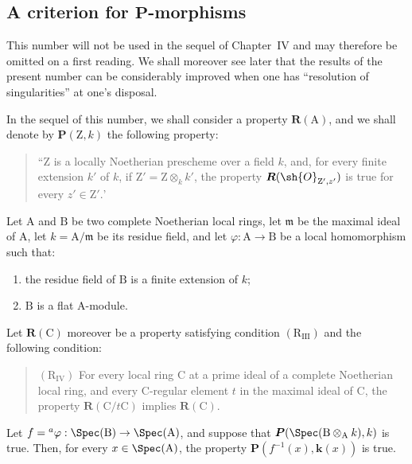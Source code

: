 \subsection{A criterion for \texorpdfstring{$\boldsymbol{P}$}{P}-morphisms}
\label{subsection:IV.7.5}

\begin{env}[7.5.0]
\label{IV.7.5.0}
This number will not be used in the sequel of Chapter~IV and may therefore be omitted on a first reading. We shall moreover see later  that the results of the present number can be considerably improved when one has ``resolution of singularities'' at one's disposal.

In the sequel of this number, we shall consider a property $\boldsymbol{R}(\mathrm{A})$, and we shall denote by $\boldsymbol{P}(\mathrm{Z},k)$ the following property:
\begin{quote}
``$\mathrm{Z}$ is a locally Noetherian prescheme over a field $k$, and, for every finite extension $k'$ of $k$, if $\mathrm{Z}'=\mathrm{Z}\otimes_k k'$, the property $\boldsymbol{R}(\sh{O}_{\mathrm{Z}',z'})$ is true for every $z'\in\mathrm{Z}'.$'
\end{quote}
\end{env}

\begin{theorem}[7.5.1]
\label{IV.7.5.1}
Let $\mathrm{A}$ and $\mathrm{B}$ be two complete Noetherian local rings, let $\mathfrak{m}$ be the maximal ideal of $\mathrm{A}$, let $k=\mathrm{A}/\mathfrak{m}$ be its residue field, and let $\varphi:\mathrm{A}\to\mathrm{B}$ be a local homomorphism such that:
\begin{enumerate}[label=(\roman*)]
  \item the residue field of $\mathrm{B}$ is a finite extension of $k$;
  \item $\mathrm{B}$ is a flat $\mathrm{A}$-module.
\end{enumerate}
Let $\boldsymbol{R}(\mathrm{C})$ moreover be a property satisfying condition $(\mathrm{R}_{\mathrm{III}})$  and the following condition:
\begin{quote}
$(\mathrm{R}_{\mathrm{IV}})$ For every local ring $\mathrm{C}$ at a prime ideal of a complete Noetherian local ring, and every $\mathrm{C}$-regular element $t$ in the maximal ideal of $\mathrm{C}$, the property $\boldsymbol{R}(\mathrm{C}/t\mathrm{C})$ implies $\boldsymbol{R}(\mathrm{C})$.
\end{quote}


Let $f={}^a\varphi:\Spec(\mathrm{B})\to\Spec(\mathrm{A})$, and suppose that $\boldsymbol{P}(\Spec(\mathrm{B}\otimes_\mathrm{A}k),k)$ is true. Then, for every $x\in\Spec(\mathrm{A})$, the property $\boldsymbol{P}(f^{-1}(x),\boldsymbol{k}(x))$ is true.
\end{theorem}

